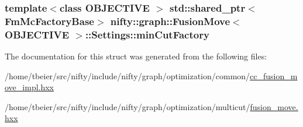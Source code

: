 \subsubsection[{min\+Cut\+Factory}]{\setlength{\rightskip}{0pt plus 5cm}template$<$class O\+B\+J\+E\+C\+T\+I\+V\+E $>$ std\+::shared\+\_\+ptr$<${\bf Fm\+Mc\+Factory\+Base}$>$ {\bf nifty\+::graph\+::\+Fusion\+Move}$<$ O\+B\+J\+E\+C\+T\+I\+V\+E $>$\+::Settings\+::min\+Cut\+Factory}\label{structnifty_1_1graph_1_1FusionMove_1_1Settings_a81df1add11545812ae40ede234c75ebd}


The documentation for this struct was generated from the following files\+:\begin{DoxyCompactItemize}
\item 
/home/tbeier/src/nifty/include/nifty/graph/optimization/common/\hyperlink{cc__fusion__move__impl_8hxx}{cc\+\_\+fusion\+\_\+move\+\_\+impl.\+hxx}\item 
/home/tbeier/src/nifty/include/nifty/graph/optimization/multicut/\hyperlink{multicut_2fusion__move_8hxx}{fusion\+\_\+move.\+hxx}\end{DoxyCompactItemize}

